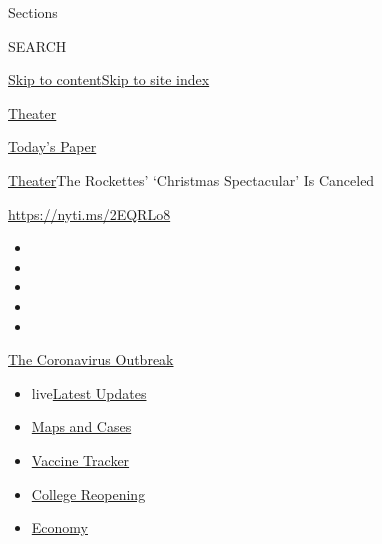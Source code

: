 Sections

SEARCH

\protect\hyperlink{site-content}{Skip to
content}\protect\hyperlink{site-index}{Skip to site index}

\href{https://www.nytimes3xbfgragh.onion/section/theater}{Theater}

\href{https://myaccount.nytimes3xbfgragh.onion/auth/login?response_type=cookie\&client_id=vi}{}

\href{https://www.nytimes3xbfgragh.onion/section/todayspaper}{Today's
Paper}

\href{/section/theater}{Theater}\textbar{}The Rockettes' `Christmas
Spectacular' Is Canceled

\url{https://nyti.ms/2EQRLo8}

\begin{itemize}
\item
\item
\item
\item
\item
\end{itemize}

\href{https://www.nytimes3xbfgragh.onion/news-event/coronavirus?action=click\&pgtype=Article\&state=default\&region=TOP_BANNER\&context=storylines_menu}{The
Coronavirus Outbreak}

\begin{itemize}
\tightlist
\item
  live\href{https://www.nytimes3xbfgragh.onion/2020/08/04/world/coronavirus-cases.html?action=click\&pgtype=Article\&state=default\&region=TOP_BANNER\&context=storylines_menu}{Latest
  Updates}
\item
  \href{https://www.nytimes3xbfgragh.onion/interactive/2020/us/coronavirus-us-cases.html?action=click\&pgtype=Article\&state=default\&region=TOP_BANNER\&context=storylines_menu}{Maps
  and Cases}
\item
  \href{https://www.nytimes3xbfgragh.onion/interactive/2020/science/coronavirus-vaccine-tracker.html?action=click\&pgtype=Article\&state=default\&region=TOP_BANNER\&context=storylines_menu}{Vaccine
  Tracker}
\item
  \href{https://www.nytimes3xbfgragh.onion/2020/08/02/us/covid-college-reopening.html?action=click\&pgtype=Article\&state=default\&region=TOP_BANNER\&context=storylines_menu}{College
  Reopening}
\item
  \href{https://www.nytimes3xbfgragh.onion/live/2020/08/04/business/stock-market-today-coronavirus?action=click\&pgtype=Article\&state=default\&region=TOP_BANNER\&context=storylines_menu}{Economy}
\end{itemize}

